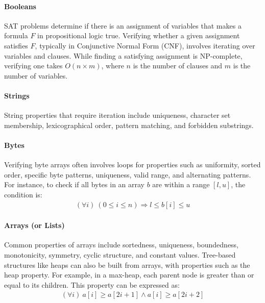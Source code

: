 \documentclass[runningheads]{llncs}
\begin{document}
\paragraph{\textbf{Booleans}}
SAT problems determine if there is an assignment of variables that makes a formula \( F \) in propositional logic true. Verifying whether a given assignment satisfies \( F \), typically in Conjunctive Normal Form (CNF), involves iterating over variables and clauses. While finding a satisfying assignment is NP-complete, verifying one takes \( O(n \times m) \), where \( n \) is the number of clauses and \( m \) is the number of variables.
\paragraph{\textbf{Strings}}
String properties that require iteration include uniqueness, character set membership, lexicographical order, pattern matching, and forbidden substrings. %
\paragraph{\textbf{Bytes}}
Verifying byte arrays often involves loops for properties such as uniformity, sorted order, specific byte patterns, uniqueness, valid range, and alternating patterns. For instance, to check if all bytes in an array \(b\) are within a range \([l, u]\), the condition is:
\begin{gather*}
(\forall i) \ (0 \leq i \leq n) \Rightarrow l \leq b[i] \leq u
\end{gather*}
\paragraph{\textbf{Arrays (or Lists)}}
Common properties of arrays include sortedness, uniqueness, boundedness, monotonicity, symmetry, cyclic structure, and constant values. %
Tree-based structures like heaps can also be built from arrays, with properties such as the heap property. For example, in a max-heap, each parent node is greater than or equal to its children. This property can be expressed as:
\begin{gather*}
(\forall i) \ a[i] \geq a[2i+1] \land a[i] \geq a[2i+2]
\end{gather*}
\end{document}
